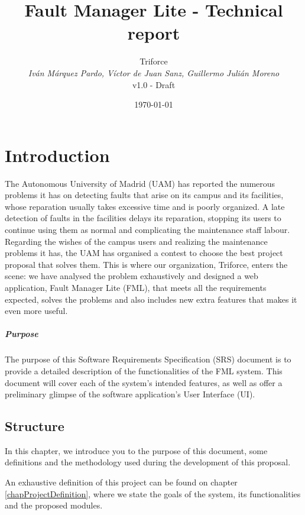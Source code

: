 \documentclass{report}
\title{Fault Manager Lite - Technical report}
\date{\today}
\author{{\Large Triforce} \\ \vspace{5pt} \textit{Iván Márquez Pardo, Víctor de Juan Sanz, Guillermo Julián Moreno} \\ v1.0 - Draft}
\begin{document}
\maketitle
\tableofcontents
\newpage
\pagestyle{plain}
\begin{abstract}
\end{abstract}

\chapter{Introduction}

The Autonomous University of Madrid (UAM) has reported the numerous problems it has on detecting faults that arise on its campus and its facilities, whose reparation usually takes excessive time and is poorly organized. A late detection of faults in the facilities delays its reparation, stopping its users to continue using them as normal and complicating the maintenance staff labour. Regarding the wishes of the campus users and realizing the maintenance problems it has, the UAM has organised a contest to choose the best project proposal that solves them.
This is where our organization, Triforce, enters the scene: we have analysed the problem exhaustively and designed a web application, Fault Manager Lite (FML), that meets all the requirements expected, solves the problems and also includes new extra features that makes it even more useful.

\paragraph{Purpose} The purpose of this Software Requirements Specification (SRS) document is to provide a detailed description of the functionalities of the FML system. This document will cover each of the system's intended features, as well as offer a preliminary glimpse of the software application's User Interface (UI).

\section{Structure}

In this chapter, we introduce you to the purpose of this document, some definitions and the methodology used during the development of this proposal.

An exhaustive definition of this project can be found on chapter \ref{chapProjectDefinition}, where we state the goals of the system, its functionalities and the proposed modules.
\end{document}

